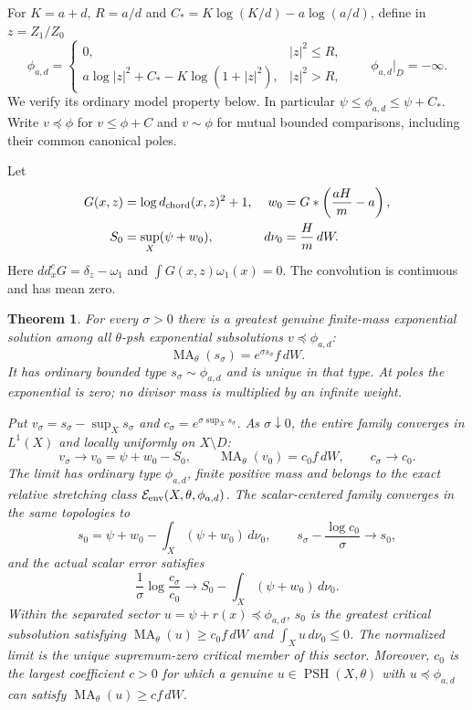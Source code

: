 \documentclass[11pt]{article}
\newcommand{\ddc}{dd^c}
\newcommand{\PSH}{\operatorname{PSH}}
\newcommand{\MA}{\operatorname{MA}}
\newcommand{\E}{\mathcal E}
\newtheorem{theorem}{Theorem}
\theoremstyle{remark}\newtheorem{remark}[theorem]{Remark}
\begin{document}
For $K=a+d$, $R=a/d$ and
$C_*=K\log(K/d)-a\log(a/d)$, define in $z=Z_1/Z_0$
\begin{equation}\label{eq:model}
 \phi_{a,d}=\begin{cases}
 0,& |z|^2\leq R,\\
 a\log|z|^2+C_*-K\log(1+|z|^2),& |z|^2>R,
 \end{cases}\qquad \phi_{a,d}|_D=-\infty.
\end{equation}
We verify its ordinary model property below. In particular
$\psi\leq\phi_{a,d}\leq\psi+C_*$.
Write $v\preceq\phi$ for $v\leq\phi+C$ and $v\sim\phi$ for mutual
bounded comparisons, including their common canonical poles.

Let
\[
 \begin{aligned}
 G(x,z)&=\log d_{\rm chord}(x,z)^2+1,
 &w_0&=G*\left(\frac{aH}{m}-a\right),\\
 S_0&=\sup_X(\psi+w_0),
 &d\nu_0&=\frac Hm\,dW.
 \end{aligned}
\]
Here $\ddc_xG=\delta_z-\omega_1$ and $\int G(x,z)\omega_1(x)=0$.
The convolution is continuous and has mean zero.

\begin{theorem}\label{thm:fixed}
For every $\sigma>0$ there is a greatest genuine finite-mass exponential
solution among all $\theta$-psh exponential subsolutions $v\preceq\phi_{a,d}$:
\[
 \MA_\theta(s_\sigma)=e^{\sigma s_\sigma}f\,dW.
\]
It has ordinary bounded type $s_\sigma\sim\phi_{a,d}$ and is unique in that type.
At poles the exponential is zero; no divisor mass is multiplied by an
infinite weight.

Put $v_\sigma=s_\sigma-\sup_Xs_\sigma$ and
$c_\sigma=e^{\sigma\sup_Xs_\sigma}$. As $\sigma\downarrow0$, the entire family
converges in $L^1(X)$ and locally uniformly on $X\setminus D$:
\[
 v_\sigma\longrightarrow v_0=\psi+w_0-S_0,\qquad
 \MA_\theta(v_0)=c_0 f\,dW,\qquad c_\sigma\longrightarrow c_0.
\]
The limit has ordinary type $\phi_{a,d}$, finite positive mass and belongs
to the exact relative stretching class $\E_{\rm env}(X,\theta,\phi_{a,d})$.
The scalar-centered family converges in the same topologies to
\[
 s_0=\psi+w_0-\int_X(\psi+w_0)\,d\nu_0,
 \qquad s_\sigma-\frac{\log c_0}{\sigma}\longrightarrow s_0,
\]
and the actual scalar error satisfies
\[
 \frac1\sigma\log\frac{c_\sigma}{c_0}
 \longrightarrow S_0-\int_X(\psi+w_0)\,d\nu_0.
\]
Within the separated sector $u=\psi+r(x)\preceq\phi_{a,d}$, $s_0$ is
the greatest critical subsolution satisfying
$\MA_\theta(u)\geq c_0f\,dW$ and $\int_Xu\,d\nu_0\leq0$.
The normalized limit is the unique supremum-zero critical member of this sector.
Moreover, $c_0$ is the largest coefficient $c>0$ for which a genuine
$u\in\PSH(X,\theta)$ with $u\preceq\phi_{a,d}$ can satisfy
$\MA_\theta(u)\geq c f\,dW$.
\end{theorem}
\end{document}
